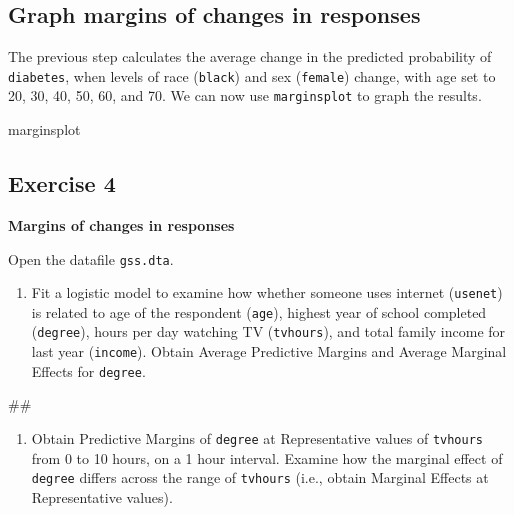 \documentclass[
]{book}
\newenvironment{Shaded}{\begin{snugshade}}{\end{snugshade}}
\newcommand{\NormalTok}[1]{#1}
\providecommand{\tightlist}{%
  \setlength{\itemsep}{0pt}\setlength{\parskip}{0pt}}
\begin{document}
\hypertarget{graph-margins-of-changes-in-responses}{%
\subsection{Graph margins of changes in responses}\label{graph-margins-of-changes-in-responses}}

The previous step calculates the average change in the predicted probability of \texttt{diabetes}, when levels of race (\texttt{black}) and sex (\texttt{female}) change, with age set to 20, 30, 40, 50, 60, and 70. We can now use \texttt{marginsplot} to graph the results.

\begin{Shaded}
\begin{Highlighting}[]
\NormalTok{marginsplot}
\end{Highlighting}
\end{Shaded}

\hypertarget{exercise-4-2}{%
\subsection{Exercise 4}\label{exercise-4-2}}

\textbf{Margins of changes in responses}

Open the datafile \texttt{gss.dta}.

\begin{enumerate}
\def\labelenumi{\arabic{enumi}.}
\tightlist
\item
  Fit a logistic model to examine how whether someone uses internet (\texttt{usenet}) is related to age of the respondent (\texttt{age}), highest year of school completed (\texttt{degree}), hours per day watching TV (\texttt{tvhours}), and total family income for last year (\texttt{income}). Obtain Average Predictive Margins and Average Marginal Effects for \texttt{degree}.
\end{enumerate}

\begin{Shaded}
\begin{Highlighting}[]
\NormalTok{\#\# }
\end{Highlighting}
\end{Shaded}

\begin{enumerate}
\def\labelenumi{\arabic{enumi}.}
\setcounter{enumi}{1}
\tightlist
\item
  Obtain Predictive Margins of \texttt{degree} at Representative values of \texttt{tvhours} from 0 to 10 hours, on a 1 hour interval. Examine how the marginal effect of \texttt{degree} differs across the range of \texttt{tvhours} (i.e., obtain Marginal Effects at Representative values).
\end{enumerate}
\end{document}
